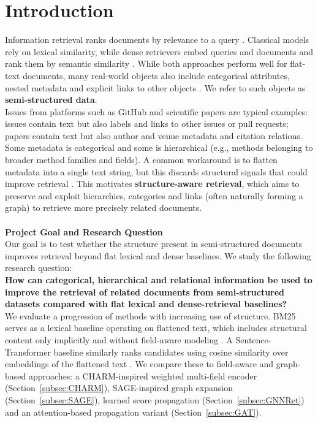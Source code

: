 \documentclass[11pt]{article}
\begin{document}
\section{Introduction}
Information retrieval ranks documents by relevance to a query \cite{Manning_Raghavan_Schütze_2008}. Classical models rely on lexical similarity, while dense retrievers embed queries and documents and rank them by semantic similarity \cite{xu2026surveymodelarchitecturesinformation}. While both approaches perform well for flat-text documents, many real-world objects also include categorical attributes, nested metadata and explicit links to other objects \cite{wu2024starkbenchmarkingllmretrieval}. We refer to such objects as \textbf{semi-structured data}.\\
Issues from platforms such as GitHub and scientific papers are typical examples: issues contain text but also labels and links to other issues or pull requests; papers contain text but also author and venue metadata and citation relations. Some metadata is categorical and some is hierarchical (e.g., methods belonging to broader method families and fields). A common workaround is to flatten metadata into a single text string, but this discards structural signals that could improve retrieval \cite{yousuf2026utilizing}. This motivates \textbf{structure-aware retrieval}, which aims to preserve and exploit hierarchies, categories and links (often naturally forming a graph) to retrieve more precisely related documents. \\
\\
\textbf{Project Goal and Research Question} \\
Our goal is to test whether the structure present in semi-structured documents improves retrieval beyond flat lexical and dense baselines. We study the following research question:\\
\textbf{How can categorical, hierarchical and relational information be used to improve the retrieval of related documents from semi-structured datasets compared with flat lexical and dense-retrieval baselines?}\\
We evaluate a progression of methods with increasing use of structure. BM25 serves as a lexical baseline operating on flattened text, which includes structural content only implicitly and without field-aware modeling \cite{robertson2009probabilistic}. A Sentence-Transformer baseline similarly ranks candidates using cosine similarity over embeddings of the flattened text \cite{reimers-2019-sentence-bert}. We compare these to field-aware and graph-based approaches: a CHARM-inspired weighted multi-field encoder (Section~\ref{subsec:CHARM}), SAGE-inspired graph expansion (Section~\ref{subsec:SAGE}), learned score propagation (Section~\ref{subsec:GNNRet}) and an attention-based propagation variant (Section~\ref{subsec:GAT}).
\end{document}
